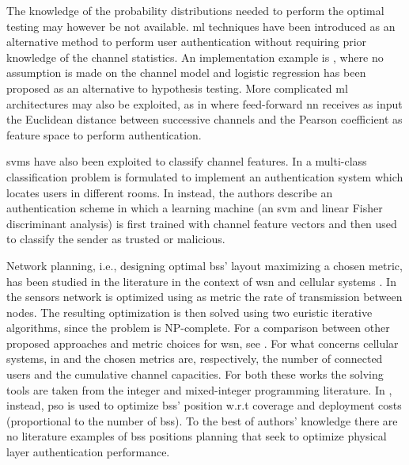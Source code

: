 \documentclass[twocolumns]{IEEEtran}
\begin{document}
The knowledge of the probability distributions needed to perform the optimal testing may however be not available. \ac{ml} techniques have been introduced as an alternative method to perform user authentication without requiring prior knowledge of the channel statistics. An implementation example is \cite{xiao-2018}, where no assumption is made on the channel model and logistic regression has been proposed as an alternative to hypothesis testing. More complicated \ac{ml} architectures may also be exploited, as in \cite{Wang-17} where feed-forward \ac{nn} receives as input the Euclidean distance between successive channels and the Pearson coefficient as feature space to perform authentication. 

\Acp{svm} have also been exploited to classify channel features. In \cite{tian2015robust} a multi-class classification problem is formulated to implement an authentication system which locates users in different rooms. In \cite{pei2014channel} instead, the authors describe an authentication scheme in which a learning machine (an \ac{svm} and linear Fisher discriminant analysis) is first trained with channel feature vectors and then used to classify the sender as trusted or malicious. 

Network planning, i.e., designing optimal \acp{bs}' layout maximizing a chosen metric, has been studied in the literature in the context of \ac{wsn} \cite{bogdanov2004power} \cite{akkaya2007positioning} and cellular systems \cite{mathar2001optimal} \cite{glasser2005complexity}  \cite{islam2012capacity} \cite{yangyang2004particle}. In \cite{bogdanov2004power} the sensors network is optimized using as metric the rate of transmission between nodes. The resulting optimization is then solved using two euristic iterative algorithms, since the problem is NP-complete. For a comparison between other proposed approaches and metric choices for \ac{wsn}, see \cite{akkaya2007positioning}. For what concerns cellular systems, in \cite{mathar2001optimal} and \cite{islam2012capacity} the chosen metrics are, respectively, the number of connected users and the cumulative channel capacities. For both these works the solving tools are taken from the integer and mixed-integer programming literature. In \cite{yangyang2004particle}, instead, \ac{pso} is used to optimize \acp{bs}' position w.r.t coverage and deployment costs (proportional to  the number of \acp{bs}).
To the best of authors' knowledge there are no literature examples of \acp{bs} positions planning that seek to optimize physical layer authentication performance.
\end{document}
